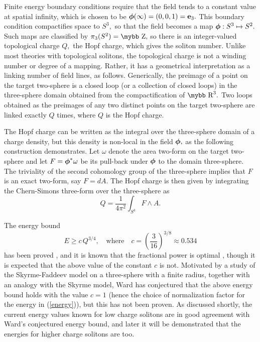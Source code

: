 \documentclass[12pt]{article}
\newcommand{\be}{\begin{equation}}
\newcommand{\ee}{\end{equation}}
\newcommand{\bphi}{\mbox{\boldmath $\phi$}}
\def\bb#1{\hbox{\mybb#1}}
\begin{document}
Finite energy boundary conditions require that the field tends to a
constant value at spatial infinity, which is chosen to be
$\bphi(\infty)=(0,0,1)={\bf e}_3.$  This boundary condition
compactifies space to $S^3,$ so that the field becomes a map $\bphi:
S^3\mapsto S^2.$ Such maps are classified by $\pi_3(S^2)=\bb{Z},$ so
there is an integer-valued topological charge $Q,$ the Hopf charge,
which gives the soliton number. Unlike most theories with
topological solitons, the topological charge is not a winding number
or degree of a mapping. Rather, it has a geometrical interpretation
as a linking number of field lines, as follows. Generically, the
preimage of a point on the target two-sphere is a closed loop (or a
collection of closed loops) in the three-sphere domain obtained from
the compactification of $\bb{R}^3.$ Two loops obtained as the
preimages of any two distinct points on the target two-sphere are
linked exactly $Q$ times, where $Q$ is the Hopf charge.

The Hopf charge can be written as the integral over the three-sphere
domain of a charge density, but this density is non-local in the
field $\bphi,$ as the following construction demonstrates. Let
$\omega$ denote the area two-form on the target two-sphere and let
$F=\bphi^*\omega$ be its pull-back under $\bphi$ to the domain
three-sphere. The triviality of the second cohomology group of the
three-sphere implies that $F$ is an exact two-form, say $F=dA.$ The
Hopf charge is then given by integrating the Chern-Simons three-form
over the three-sphere as \be Q=\frac{1}{4\pi^2}\int_{S^3}F\wedge
A.\ee

The energy bound \be E\ge c\, Q^{3/4},\quad \mbox{where} \quad
c=\left(\frac{3}{16}\right)^{3/8}\approx 0.534\ee has been proved
\cite{VK,KR}, and it is known that the fractional power is optimal
\cite{LY}, though it is expected that the above value of the
constant $c$ is not. Motivated by a study of the Skyrme-Faddeev
model on a three-sphere with a finite radius, together with an
analogy with the Skyrme model, Ward has conjectured \cite{Wa4} that
the above energy bound holds with the value $c=1$ (hence the choice
of normalization factor for the energy in (\ref{energy})), but this
has not been proven. As discussed shortly, the current energy values
known for low charge solitons are in good agreement with Ward's
conjectured energy bound, and later it will be demonstrated that the
energies for higher charge solitons are too.
\end{document}
